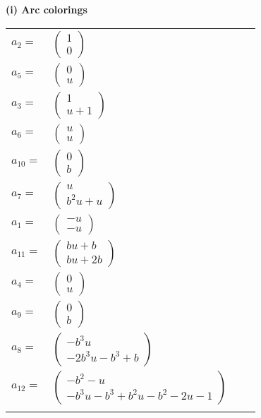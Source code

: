 \documentclass[1p]{elsarticle_modified}
\theoremstyle{definition}
\begin{document}
\flushleft \textbf{(i) Arc colorings}\\
\begin{tabular}{m{7pt} m{180pt} m{7pt} m{180pt} }
\flushright $a_{2}=$&$\begin{pmatrix}1\\0\end{pmatrix}$ \\
\flushright $a_{5}=$&$\begin{pmatrix}0\\u\end{pmatrix}$ \\
\flushright $a_{3}=$&$\begin{pmatrix}1\\u+1\end{pmatrix}$ \\
\flushright $a_{6}=$&$\begin{pmatrix}u\\u\end{pmatrix}$ \\
\flushright $a_{10}=$&$\begin{pmatrix}0\\b\end{pmatrix}$ \\
\flushright $a_{7}=$&$\begin{pmatrix}u\\b^2 u+u\end{pmatrix}$ \\
\flushright $a_{1}=$&$\begin{pmatrix}- u\\- u\end{pmatrix}$ \\
\flushright $a_{11}=$&$\begin{pmatrix}b u+b\\b u+2 b\end{pmatrix}$ \\
\flushright $a_{4}=$&$\begin{pmatrix}0\\u\end{pmatrix}$ \\
\flushright $a_{9}=$&$\begin{pmatrix}0\\b\end{pmatrix}$ \\
\flushright $a_{8}=$&$\begin{pmatrix}- b^3 u\\-2 b^3 u- b^3+b\end{pmatrix}$ \\
\flushright $a_{12}=$&$\begin{pmatrix}- b^2- u\\- b^3 u- b^3+b^2 u- b^2-2 u-1\end{pmatrix}$\\&\end{tabular}
\end{document}
